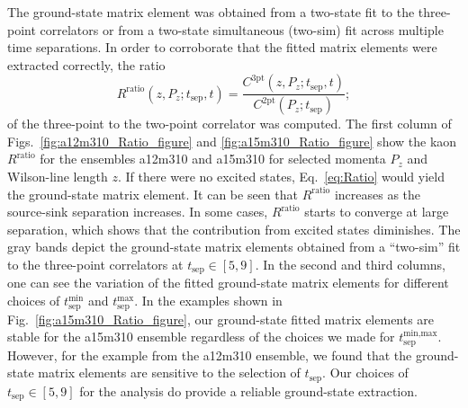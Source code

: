 The ground-state matrix element was obtained from a two-state fit to the three-point correlators or from a two-state simultaneous (two-sim) fit
across multiple time separations.
In order to corroborate that the fitted matrix elements were extracted correctly, the ratio
%
\begin{equation}\label{eq:Ratio}
R^\text{ratio}(z,P_z;t_\text{sep},t) = \frac{C^\text{3pt}(z,P_z;t_\text{sep},t)}{C^\text{2pt}(P_z;t_\text{sep})};
\end{equation}
%
of the three-point to the two-point correlator was computed.
The first column of Figs.~\ref{fig:a12m310_Ratio_figure} and \ref{fig:a15m310_Ratio_figure} show the kaon $R^\text{ratio}$ for the ensembles a12m310 and a15m310 for selected momenta $P_z$ and Wilson-line length $z$.
If there were no excited states, Eq.~\ref{eq:Ratio} would yield the ground-state matrix element.
It can be seen that $R^\text{ratio}$ increases as the source-sink separation increases.
In some cases, $R^\text{ratio}$ starts to converge at large separation, which shows that the contribution from excited states diminishes.
The gray bands depict the ground-state matrix elements obtained from a ``two-sim'' fit to the three-point correlators at $t_\text{sep}\in [5,9]$.
In the second and third columns, one can see the variation of the fitted ground-state matrix elements for different choices of $t_\text{sep}^\text{min}$ and $t_\text{sep}^\text{max}$.
In the examples shown in Fig.~\ref{fig:a15m310_Ratio_figure}, our ground-state fitted matrix elements are stable for the a15m310 ensemble regardless of the choices we made for $t_\text{sep}^{\text{min},\text{max}}$.
However, for the example from the a12m310 ensemble, we found that the ground-state matrix elements are sensitive to the selection of $t_\text{sep}$.
Our choices of $t_\text{sep}\in [5,9]$ for the analysis do provide a reliable ground-state extraction.



